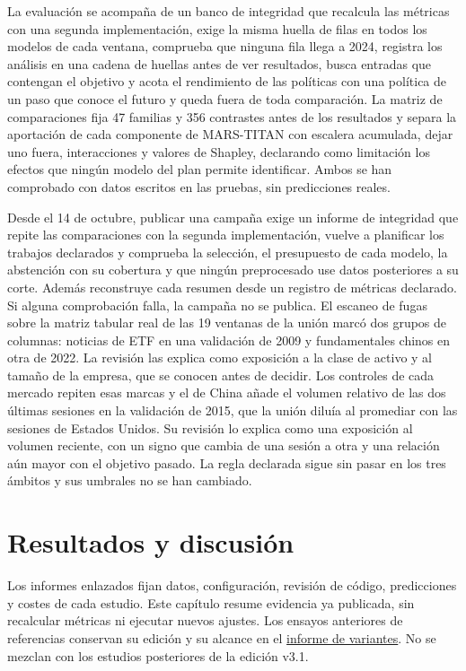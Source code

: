 \documentclass[11pt,a4paper]{report}
\begin{document}
La evaluación se acompaña de un banco de integridad que recalcula las métricas
con una segunda implementación, exige la misma huella de filas en todos los
modelos de cada ventana, comprueba que ninguna fila llega a 2024, registra los
análisis en una cadena de huellas antes de ver resultados, busca entradas que
contengan el objetivo y acota el rendimiento de las políticas con una política de
un paso que conoce el futuro y queda fuera de toda comparación. La matriz de comparaciones fija
47 familias y 356 contrastes antes de los resultados y separa la aportación de
cada componente de MARS-TITAN con escalera acumulada, dejar uno fuera,
interacciones y valores de Shapley, declarando como limitación los efectos que
ningún modelo del plan permite identificar. Ambos se han comprobado con datos
escritos en las pruebas, sin predicciones reales.

Desde el 14 de octubre, publicar una campaña exige un informe de integridad
que repite las comparaciones con la segunda implementación, vuelve a planificar
los trabajos declarados y comprueba la selección, el presupuesto de cada
modelo, la abstención con su cobertura y que ningún preprocesado use datos
posteriores a su corte. Además reconstruye cada resumen desde un registro de
métricas declarado. Si alguna comprobación falla, la campaña no se publica. El
escaneo de fugas sobre la matriz tabular real de las 19 ventanas de la unión
marcó dos grupos de columnas: noticias de ETF en una validación de 2009 y
fundamentales chinos en otra de 2022. La revisión las explica como exposición
a la clase de activo y al tamaño de la empresa, que se conocen antes de
decidir. Los controles de cada mercado repiten esas marcas y el de China añade
el volumen relativo de las dos últimas sesiones en la validación de 2015, que
la unión diluía al promediar con las sesiones de Estados Unidos. Su revisión
lo explica como una exposición al volumen reciente, con un signo que cambia de
una sesión a otra y una relación aún mayor con el objetivo pasado. La regla
declarada sigue sin pasar en los tres ámbitos y sus umbrales no se han
cambiado.

\chapter{Resultados y discusión}
\label{cap:resultados}
Los informes enlazados fijan datos, configuración, revisión de código,
predicciones y costes de cada estudio. Este capítulo resume evidencia ya
publicada, sin recalcular métricas ni ejecutar nuevos ajustes. Los ensayos
anteriores de referencias conservan su edición y su alcance en el
\href{https://github.com/GonxKZ/mars-titan/blob/8b7e2a5600be568cc1299f2a661da15b5090c45e/reports/baselines/reference-variants.md}{informe de variantes}.
No se mezclan con los estudios posteriores de la edición v3.1.
\end{document}
